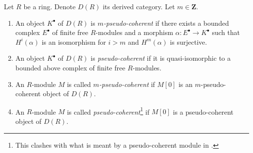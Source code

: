 \begin{definition}
\label{definition-pseudo-coherent}
Let $R$ be a ring. Denote $D(R)$ its derived category.
Let $m \in \mathbf{Z}$.
\begin{enumerate}
\item An object $K^\bullet$ of $D(R)$ is {\it $m$-pseudo-coherent}
if there exists a bounded complex $E^\bullet$ of finite free $R$-modules
and a morphism $\alpha : E^\bullet \to K^\bullet$ such that
$H^i(\alpha)$ is an isomorphism for $i > m$ and $H^m(\alpha)$
is surjective.
\item An object $K^\bullet$ of $D(R)$ is {\it pseudo-coherent}
if it is quasi-isomorphic to a bounded above complex of finite
free $R$-modules.
\item An $R$-module $M$ is called {\it $m$-pseudo-coherent}
if $M[0]$ is an $m$-pseudo-coherent object of $D(R)$.
\item An $R$-module $M$ is called
{\it pseudo-coherent}\footnote{This clashes with what is meant by
a pseudo-coherent module in \cite{Bourbaki-CA}.}
if $M[0]$ is a pseudo-coherent object of $D(R)$.
\end{enumerate}
\end{definition}